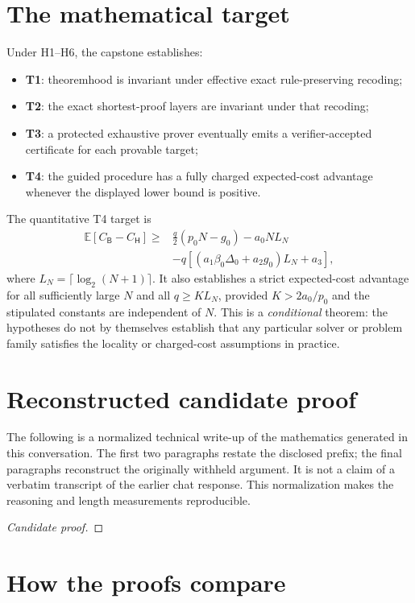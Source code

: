 \documentclass[11pt,letterpaper]{article}
\begin{document}
\section{The mathematical target}
Under H1--H6, the capstone establishes:
\begin{itemize}
\item \textbf{T1}: theoremhood is invariant under effective exact rule-preserving recoding;
\item \textbf{T2}: the exact shortest-proof layers are invariant under that recoding;
\item \textbf{T3}: a protected exhaustive prover eventually emits a verifier-accepted certificate for each provable target;
\item \textbf{T4}: the guided procedure has a fully charged expected-cost advantage whenever the displayed lower bound is positive.
\end{itemize}
The quantitative T4 target is
\begin{equation}\label{eq:target}
\begin{split}
\mathbb E[C_{\mathsf B}-C_{\mathsf H}]
\ge {}&\frac q2(p_0N-g_0)-a_0NL_N\\
&-q[(a_1\beta_0\Delta_0+a_2g_0)L_N+a_3],
\end{split}
\end{equation}
where $L_N=\lceil\log_2(N+1)\rceil$. It also establishes a strict expected-cost
advantage for all sufficiently large $N$ and all $q\ge KL_N$, provided
$K>2a_0/p_0$ and the stipulated constants are independent of $N$.
This is a \emph{conditional} theorem: the hypotheses do not by themselves establish
that any particular solver or problem family satisfies the locality or charged-cost
assumptions in practice.

\section{Reconstructed candidate proof}
The following is a normalized technical write-up of the mathematics generated in
this conversation. The first two paragraphs restate the disclosed prefix; the final
paragraphs reconstruct the originally withheld argument. It is not a claim of a
verbatim transcript of the earlier chat response. This normalization makes the
reasoning and length measurements reproducible.
\begin{proof}[Candidate proof]

\end{proof}

\section{How the proofs compare}
\end{document}
